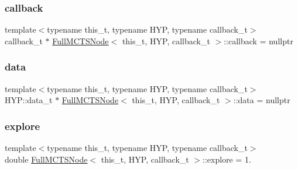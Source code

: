 \subsubsection{\texorpdfstring{callback}{callback}}
{\footnotesize\ttfamily template$<$typename this\+\_\+t, typename H\+YP, typename callback\+\_\+t$>$ \\
callback\+\_\+t $\ast$ \hyperlink{class_full_m_c_t_s_node}{Full\+M\+C\+T\+S\+Node}$<$ this\+\_\+t, H\+YP, callback\+\_\+t $>$\+::callback = nullptr\hspace{0.3cm}{\ttfamily [static]}}

\mbox{\label{class_full_m_c_t_s_node_a77c852db32724d86ad449eb08a9a1e83}} 
\subsubsection{\texorpdfstring{data}{data}}
{\footnotesize\ttfamily template$<$typename this\+\_\+t, typename H\+YP, typename callback\+\_\+t$>$ \\
H\+Y\+P\+::data\+\_\+t $\ast$ \hyperlink{class_full_m_c_t_s_node}{Full\+M\+C\+T\+S\+Node}$<$ this\+\_\+t, H\+YP, callback\+\_\+t $>$\+::data = nullptr\hspace{0.3cm}{\ttfamily [static]}}

\mbox{\label{class_full_m_c_t_s_node_a4f2a0854002ca86dc0917487ba75a273}} 
\subsubsection{\texorpdfstring{explore}{explore}}
{\footnotesize\ttfamily template$<$typename this\+\_\+t, typename H\+YP, typename callback\+\_\+t$>$ \\
double \hyperlink{class_full_m_c_t_s_node}{Full\+M\+C\+T\+S\+Node}$<$ this\+\_\+t, H\+YP, callback\+\_\+t $>$\+::explore = 1.\hspace{0.3cm}{\ttfamily [static]}}

\mbox{\label{class_full_m_c_t_s_node_a35fe0f5a86059bd1041151dbe982d649}} 
